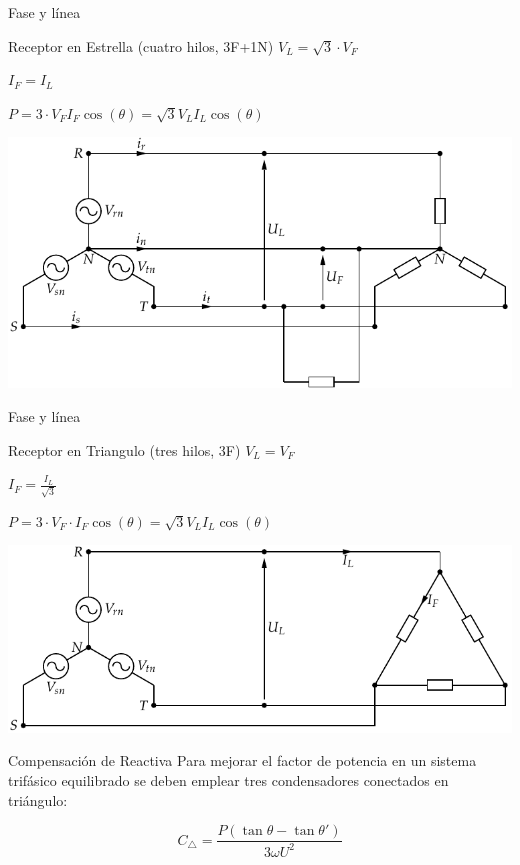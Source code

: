 \documentclass[xcolor={usenames,svgnames,dvipsnames}]{beamer}
\begin{document}
\begin{frame}[label={sec:org1a2dda4}]{Fase y línea}
\begin{block}{Receptor en Estrella (cuatro hilos, 3F+1N)}
\(V_{L}=\sqrt{3}\cdot V_{F}\) 

\(I_{F}=I_{L}\)

\(P=3\cdot V_{F}I_{F}\cos(\theta)=\sqrt{3}V_{L}I_{L}\cos(\theta)\)
\begin{center}
\includegraphics[width=.9\linewidth]{../figs/RedTrifasicaEstrella_CargaMonofasica.pdf}
\end{center}
\end{block}
\end{frame}

\begin{frame}[label={sec:org2d149f6}]{Fase y línea}
\begin{block}{Receptor en Triangulo (tres hilos, 3F)}
\(V_{L}=V_{F}\) 

\(I_{F}=\frac{I_{L}}{\sqrt{3}}\)

\(P=3\cdot V_{F}\cdot I_{F}\cos(\theta)=\sqrt{3}V_{L}I_{L}\cos(\theta)\)
\begin{center}
\includegraphics[width=.9\linewidth]{../figs/RedTrifasicaEstrella_CargaTriangulo.pdf}
\end{center}
\end{block}
\end{frame}

\begin{frame}[label={sec:orga9cdc11}]{Compensación de Reactiva}
Para mejorar el factor de potencia en un sistema trifásico equilibrado se deben emplear \alert{tres condensadores conectados en triángulo}:

\[
  C_\triangle = \frac{P(\tan \theta - \tan \theta')}{3\omega U^2}
\]
\end{frame}
\end{document}
